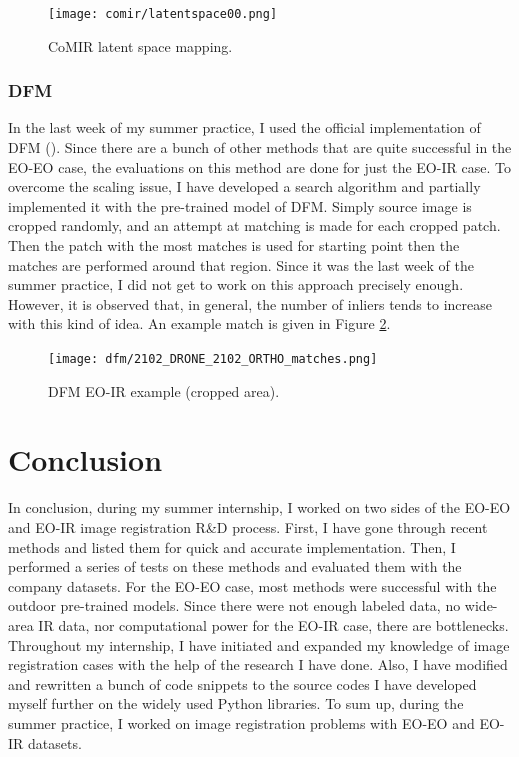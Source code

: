 \documentclass[letterpaper,12pt]{article}
\begin{document}
\begin{figure}[H]
    \centering
    \texttt{[image: comir/latentspace00.png]}
    \caption{CoMIR latent space mapping.}
    \label{comir-res}
\end{figure} 

\subsubsection{DFM}
In the last week of my summer practice, I used the official implementation of DFM (\cite{DFMcode}). Since there are a bunch of other methods that are quite successful in the EO-EO case, the evaluations on this method are done for just the EO-IR case. To overcome the scaling issue, I have developed a search algorithm and partially implemented it with the pre-trained model of DFM. Simply source image is cropped randomly, and an attempt at matching is made for each cropped patch. Then the patch with the most matches is used for starting point then the matches are performed around that region. Since it was the last week of the summer practice, I did not get to work on this approach precisely enough. However, it is observed that, in general, the number of inliers tends to increase with this kind of idea. An example match is given in Figure \ref{dfm-res}.



\begin{figure}[H]
    \centering
    \texttt{[image: dfm/2102\_DRONE\_2102\_ORTHO\_matches.png]}
    \caption{DFM EO-IR example (cropped area).}
    \label{dfm-res}
\end{figure} 


\section{Conclusion}
In conclusion, during my summer internship, I worked on two sides of the EO-EO and EO-IR image registration R\&D process. First, I have gone through recent methods and listed them for quick and accurate implementation. Then, I performed a series of tests on these methods and evaluated them with the company datasets. For the EO-EO case, most methods were successful with the outdoor pre-trained models. Since there were not enough labeled data, no wide-area IR data, nor computational power for the EO-IR case, there are bottlenecks. Throughout my internship, I have initiated and expanded my knowledge of image registration cases with the help of the research I have done. Also, I have modified and rewritten a bunch of code snippets to the source codes I have developed myself further on the widely used Python libraries. To sum up, during the summer practice, I worked on image registration problems with EO-EO and EO-IR datasets. 
\end{document}
